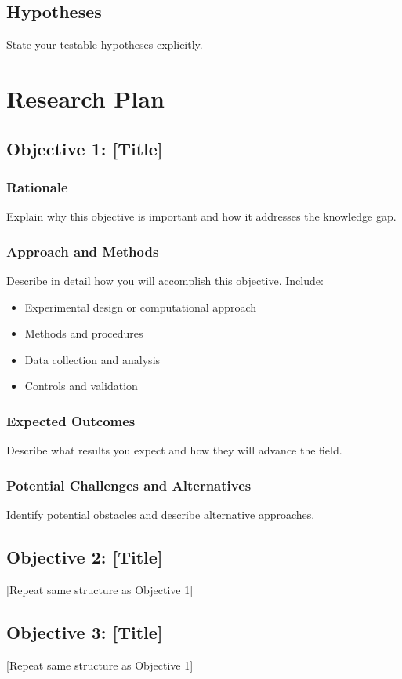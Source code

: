 \documentclass[11pt,letterpaper]{article}
\begin{document}
\subsection{Hypotheses}
State your testable hypotheses explicitly.

\section{Research Plan}
\subsection{Objective 1: [Title]}
\subsubsection{Rationale}
Explain why this objective is important and how it addresses the knowledge gap.

\subsubsection{Approach and Methods}
Describe in detail how you will accomplish this objective. Include:
\begin{itemize}
    \item Experimental design or computational approach
    \item Methods and procedures
    \item Data collection and analysis
    \item Controls and validation
\end{itemize}

\subsubsection{Expected Outcomes}
Describe what results you expect and how they will advance the field.

\subsubsection{Potential Challenges and Alternatives}
Identify potential obstacles and describe alternative approaches.

\subsection{Objective 2: [Title]}
[Repeat same structure as Objective 1]

\subsection{Objective 3: [Title]}
[Repeat same structure as Objective 1]
\end{document}
